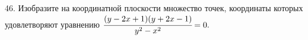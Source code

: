 46. Изобразите на координатной плоскости множество точек, координаты которых удовлетворяют уравнению $\cfrac{(y-2x+1)(y+2x-1)}{y^2-x^2}=0.$\\
